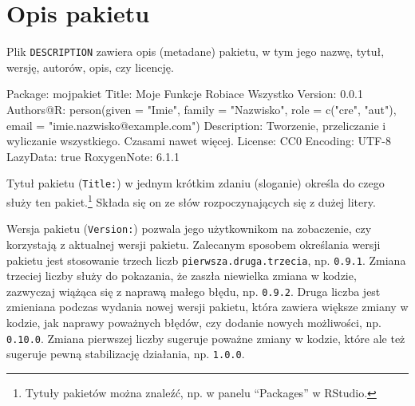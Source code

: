 \documentclass[paper=6in:9in,pagesize=pdftex,headinclude=on,footinclude=on,10pt]{scrbook}
\newenvironment{Shaded}{\begin{snugshade}}{\end{snugshade}}
\newcommand{\AttributeTok}[1]{\textcolor[rgb]{0.77,0.63,0.00}{#1}}
\newcommand{\FunctionTok}[1]{\textcolor[rgb]{0.00,0.00,0.00}{#1}}
\newcommand{\NormalTok}[1]{#1}
\newcommand{\StringTok}[1]{\textcolor[rgb]{0.31,0.60,0.02}{#1}}
\begin{document}
\hypertarget{opis-pakietu}{%
\section{Opis pakietu}\label{opis-pakietu}}

Plik \texttt{DESCRIPTION} zawiera opis (metadane) pakietu, w tym jego nazwę, tytuł, wersję, autorów, opis, czy licencję.

\begin{Shaded}
\begin{Highlighting}[]
\FunctionTok{Package:}\AttributeTok{ mojpakiet}
\FunctionTok{Title:}\AttributeTok{ Moje Funkcje Robiace Wszystko}
\FunctionTok{Version:}\AttributeTok{ 0.0.1}
\FunctionTok{Authors@R:}\AttributeTok{ }
\NormalTok{    person(given = }\StringTok{"Imie"}\NormalTok{,}
\NormalTok{           family = }\StringTok{"Nazwisko"}\NormalTok{,}
\NormalTok{           role = c(}\StringTok{"cre"}\NormalTok{, }\StringTok{"aut"}\NormalTok{),}
\NormalTok{           email = }\StringTok{"imie.nazwisko@example.com"}\NormalTok{)}
\FunctionTok{Description:}\AttributeTok{ Tworzenie, przeliczanie i wyliczanie wszystkiego. }
\NormalTok{    Czasami nawet więcej.}
\FunctionTok{License:}\AttributeTok{ CC0}
\FunctionTok{Encoding:}\AttributeTok{ UTF-8}
\FunctionTok{LazyData:}\AttributeTok{ true}
\FunctionTok{RoxygenNote:}\AttributeTok{ 6.1.1}
\end{Highlighting}
\end{Shaded}

Tytuł pakietu (\texttt{Title:}) w jednym krótkim zdaniu (sloganie) określa do czego służy ten pakiet.\footnote{Tytuły pakietów można znaleźć, np. w panelu ``Packages'' w RStudio.}
Składa się on ze słów rozpoczynających się z dużej litery.

Wersja pakietu (\texttt{Version:}) pozwala jego użytkownikom na zobaczenie, czy korzystają z aktualnej wersji pakietu.
Zalecanym sposobem określania wersji pakietu jest stosowanie trzech liczb \texttt{pierwsza.druga.trzecia}, np. \texttt{0.9.1}.
Zmiana trzeciej liczby służy do pokazania, że zaszła niewielka zmiana w kodzie, zazwyczaj wiążąca się z naprawą małego błędu, np. \texttt{0.9.2}.
Druga liczba jest zmieniana podczas wydania nowej wersji pakietu, która zawiera większe zmiany w kodzie, jak naprawy poważnych błędów, czy dodanie nowych możliwości, np. \texttt{0.10.0}.
Zmiana pierwszej liczby sugeruje poważne zmiany w kodzie, które ale też sugeruje pewną stabilizację działania, np. \texttt{1.0.0}.
\end{document}
